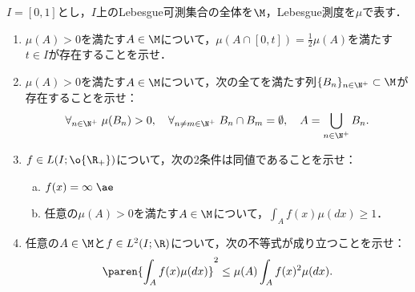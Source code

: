 \documentclass[uplatex,dvipdfmx]{jsarticle}
\begin{document}
\begin{tcolorbox}[colframe=ForestGreen, colback=ForestGreen!10!white,breakable,colbacktitle=ForestGreen!40!white,coltitle=black,fonttitle=\bfseries\sffamily,
    title=B 第12問（実解析）]
    $I=[0,1]$とし，$I$上のLebesgue可測集合の全体を$\M$，Lebesgue測度を$\mu$で表す．
    \begin{enumerate}
        \item $\mu(A)>0$を満たす$A\in\M$について，$\mu(A\cap[0,t])=\frac{1}{2}\mu(A)$を満たす$t\in I$が存在することを示せ．
        \item $\mu(A)>0$を満たす$A\in\M$について，次の全てを満たす列$\{B_n\}_{n\in\N^+}\subset\M$が存在することを示せ：
        \[\forall_{n\in\N^+}\;\mu(B_n)>0,\quad\forall_{n\ne m\in\N^+}\;B_n\cap B_m=\emptyset,\quad A=\bigcup_{n\in\N^+}B_n.\]
        \item $f\in L(I;\o{\R_+})$について，次の2条件は同値であることを示せ：
        \begin{enumerate}[(a)]
            \item $f(x)=\infty\;\ae$
            \item 任意の$\mu(A)>0$を満たす$A\in\M$について，$\int_Af(x)\mu(dx)\ge1$．
        \end{enumerate}
        \item 任意の$A\in\M$と$f\in L^2(I;\R)$について，次の不等式が成り立つことを示せ：
        \[\paren{\int_Af(x)\mu(dx)}^2\le\mu(A)\int_Af(x)^2\mu(dx).\]
    \end{enumerate}
\end{tcolorbox}
\end{document}
